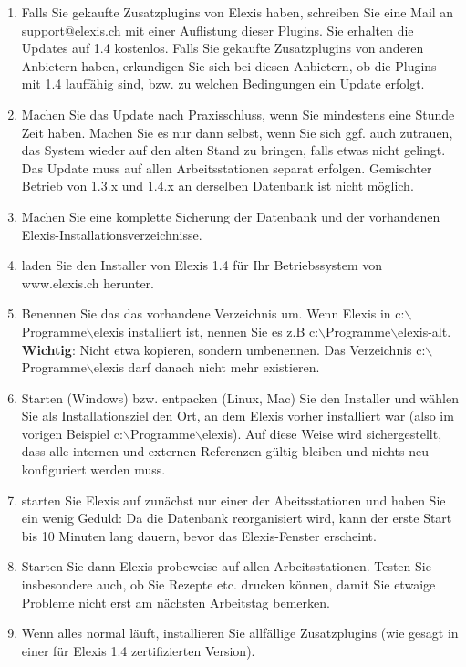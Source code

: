 \documentclass[a4paper]{scrartcl}
\begin{document}
\begin{enumerate}
\item Falls Sie gekaufte Zusatzplugins von Elexis haben, schreiben Sie eine Mail an support$@$elexis.ch mit einer Auflistung dieser Plugins. Sie erhalten die Updates auf 1.4 kostenlos.  Falls Sie gekaufte Zusatzplugins von anderen Anbietern haben, erkundigen Sie sich bei diesen Anbietern, ob die Plugins mit 1.4 lauffähig sind, bzw. zu welchen Bedingungen ein Update erfolgt.

\item Machen Sie das Update nach Praxisschluss, wenn Sie mindestens eine Stunde Zeit haben. Machen Sie es nur dann selbst, wenn Sie sich ggf. auch zutrauen, das System wieder auf den alten Stand zu bringen, falls etwas nicht gelingt. Das Update muss auf allen Arbeitsstationen separat erfolgen. Gemischter Betrieb von 1.3.x und 1.4.x an derselben Datenbank ist nicht möglich.
\item Machen Sie eine komplette Sicherung der Datenbank und der vorhandenen Elexis-Installationsverzeichnisse.
\item laden Sie den Installer von Elexis 1.4 für Ihr Betriebssystem von www.elexis.ch herunter.
\item Benennen Sie das das vorhandene Verzeichnis um. Wenn Elexis in c:$\backslash$Programme$\backslash$elexis installiert ist, nennen Sie es z.B c:$\backslash$Programme$\backslash$elexis-alt. \textbf{Wichtig}: Nicht etwa kopieren, sondern umbenennen. Das Verzeichnis c:$\backslash$Programme$\backslash$elexis darf danach nicht mehr existieren.
\item Starten (Windows) bzw. entpacken (Linux, Mac) Sie den Installer und wählen Sie als Installationsziel den Ort, an dem Elexis vorher installiert war (also im vorigen Beispiel c:$\backslash$Programme$\backslash$elexis). Auf diese Weise wird sichergestellt, dass alle internen und externen Referenzen gültig bleiben und nichts neu konfiguriert werden muss.
\item starten Sie Elexis auf zunächst nur einer der Abeitsstationen und haben Sie ein wenig Geduld: Da die Datenbank reorganisiert wird, kann der erste Start bis 10 Minuten lang dauern, bevor das Elexis-Fenster erscheint.
\item Starten Sie dann Elexis probeweise auf allen Arbeitsstationen. Testen Sie insbesondere auch, ob Sie Rezepte etc. drucken können, damit Sie etwaige Probleme nicht erst am nächsten Arbeitstag bemerken.
\item Wenn alles normal läuft, installieren Sie allfällige Zusatzplugins (wie gesagt in einer für Elexis 1.4 zertifizierten Version).
\end{enumerate}
\end{document}
